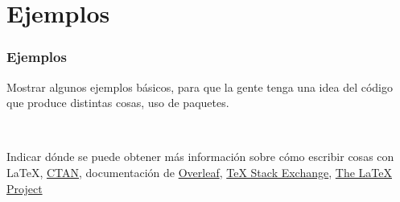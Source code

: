 \section{Ejemplos}\label{sec:ejemplos}

\begin{frame}
\frametitle{Ejemplos}
Mostrar algunos ejemplos básicos, para que la gente tenga una idea del código que produce distintas cosas, uso de paquetes.

\

Indicar dónde se puede obtener más información sobre cómo escribir cosas con \LaTeX, \href{https://ctan.org/}{CTAN},  documentación de \href{https://www.overleaf.com/learn}{Overleaf}, \href{https://tex.stackexchange.com/}{\TeX{} Stack Exchange}, \href{https://www.latex-project.org/help/documentation/}{The \LaTeX{}   Project}
    
\end{frame}
